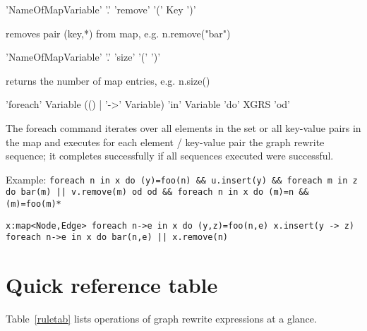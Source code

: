 \begin{rail}
  'NameOfMapVariable' '.' 'remove' '(' Key ')'
\end{rail}
removes pair (key,*) from map, e.g. n.remove("bar")

\begin{rail}
  'NameOfMapVariable' '.' 'size' '(' ')'
\end{rail}
returns the number of map entries, e.g. n.size()

\begin{rail}
  'foreach' Variable (() | '->' Variable) 'in' Variable 'do' XGRS 'od'
\end{rail}
The foreach command iterates over all elements in the set or all key-value pairs in the map and executes for each element / key-value pair the graph rewrite sequence; it completes successfully if all sequences executed were successful.

Example:
\verb#foreach n in x do (y)=foo(n) && u.insert(y) && foreach m in z do bar(m) || v.remove(m) od od && foreach n in x do (m)=n && (m)=foo(m)*#

\verb#x:map<Node,Edge> foreach n->e in x do (y,z)=foo(n,e) x.insert(y -> z) foreach n->e in x do bar(n,e) || x.remove(n)#

\section{Quick reference table}

Table~\ref{ruletab} lists operations of graph rewrite expressions at a glance.

